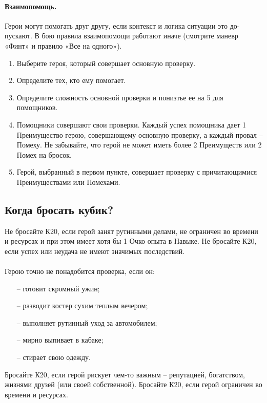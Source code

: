 \paragraph{Взаимопомощь.} Герои могут помогать друг другу, если контекст и логика ситуации это до-пускают. В бою правила взаимопомощи работают иначе (смотрите маневр «Финт» и правило «Все на одного»).
\begin{enumerate}
    \item Выберите героя, который совершает основную проверку.
    \item Определите тех, кто ему помогает. 
    \item Определите сложность основной проверки и понизтье ее на 5 для помощников. 
    \item Помощники совершают свои проверки. Каждый успех помощника дает 1 Преимущество герою, совершающему основную проверку, а каждый провал – Помеху. Не забывайте, что герой не может иметь более 2 Преимуществ или 2 Помех на бросок.
    \item Герой, выбранный в первом пункте, совершает проверку с причитающимися Преимуществами или Помехами. 
\end{enumerate}

\subsection{Когда бросать кубик?}
Не бросайте К20, если герой занят рутинными делами, не ограничен во времени и ресурсах и при этом имеет хотя бы 1 Очко опыта в Навыке. Не бросайте К20, если успех или неудача не имеют значимых последствий.
\paragraph{}Герою точно не понадобится проверка, если он:
\begin{itemize}
\item[--]готовит скромный ужин;
\item[--]разводит костер сухим теплым вечером;
\item[--]выполняет рутинный уход за автомобилем;
\item[--]мирно выпивает в кабаке;
\item[--]стирает свою одежду.
\end{itemize}

Бросайте К20, если герой рискует чем-то важным – репутацией, богатством, жизнями друзей (или своей собственной). Бросайте К20, если герой ограничен во времени и ресурсах.
